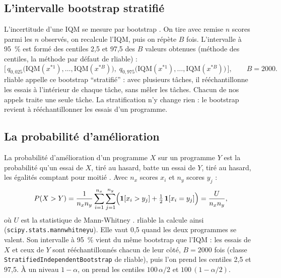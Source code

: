 \subsection{L'intervalle bootstrap stratifié}\label{sec:bootstrap}
L'incertitude d'une IQM se mesure par bootstrap \parencite{efron1979bootstrap}. On tire avec remise $n$
scores parmi les $n$ observés, on recalcule l'IQM, puis on répète $B$ fois. L'intervalle à 95~\% est formé des
centiles 2,5 et 97,5 des $B$ valeurs obtenues (méthode des centiles, la méthode par défaut de rliable) :
\begin{equation}\label{eq:bootstrap}
  \bigl[\,q_{0{,}025}\bigl(\mathrm{IQM}(x^{*1}),\dots,\mathrm{IQM}(x^{*B})\bigr),\;
  q_{0{,}975}\bigl(\mathrm{IQM}(x^{*1}),\dots,\mathrm{IQM}(x^{*B})\bigr)\,\bigr],
  \qquad B = \num{2000}.
\end{equation}
rliable appelle ce bootstrap \enquote{stratifié} : avec plusieurs tâches, il rééchantillonne les essais à
l'intérieur de chaque tâche, sans mêler les tâches. Chacun de nos appels traite une seule tâche.
La stratification n'y change rien : le bootstrap revient à rééchantillonner les essais d'un programme.

\subsection{La probabilité d'amélioration}\label{sec:poi}
La probabilité d'amélioration d'un programme $X$ sur un programme $Y$ est la probabilité qu'un essai de $X$,
tiré au hasard, batte un essai de $Y$, tiré au hasard, les égalités comptant pour moitié
\parencite{agarwal2021precipice}. Avec $n_x$ scores $x_i$ et $n_y$ scores $y_j$ :
\begin{equation}\label{eq:poi}
  P(X>Y) = \frac{1}{n_x n_y}\sum_{i=1}^{n_x}\sum_{j=1}^{n_y}
  \Bigl(\mathbf{1}[x_i>y_j] + \tfrac12\,\mathbf{1}[x_i=y_j]\Bigr) = \frac{U}{n_x n_y},
\end{equation}
où $U$ est la statistique de Mann-Whitney \parencite{mann1947test}. rliable la calcule ainsi
(\texttt{scipy.stats.mannwhitneyu}). Elle vaut 0,5 quand les deux programmes se valent. Son intervalle à
95~\% vient du même bootstrap que l'IQM : les essais de $X$ et ceux de $Y$ sont rééchantillonnés chacun de leur
côté, $B=\num{2000}$ fois (classe \texttt{StratifiedIndependentBootstrap} de rliable), puis l'on prend les
centiles 2,5 et 97,5. À un niveau $1-\alpha$, on prend les centiles $100\,\alpha/2$ et $100\,(1-\alpha/2)$.

